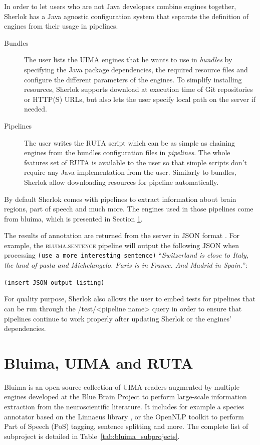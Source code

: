 \documentclass{article}
\newcommand{\ID}[1]{{\textsc{#1}}}
\newcommand{\TODO}[1]{\texttt{\textcolor{YellowOrange}{(#1)}}} %
\newcommand{\REST}[1]{\textsf{#1}}
\begin{document}
In order to let users who are not Java developers combine engines together, Sherlok has a Java
agnostic configuration system that separate the definition of engines from their usage in pipelines.

\begin{description}
    \item[Bundles] The user lists the UIMA engines that he wants to use in \emph{bundles} by specifying
        the Java package dependencies, the required resource files and configure the different
        parameters of the engines. To simplify installing resources, Sherlok supports download at
        execution time of Git repositories or HTTP(S) URLs, but also lets the user specify local
        path on the server if needed.
    \item[Pipelines] The user writes the RUTA script which can be as simple as chaining engines from
        the bundles configuration files in \emph{pipelines}. The whole features set of RUTA is
        available to the user so that simple scripts don't require any Java implementation from the
        user. Similarly to bundles, Sherlok allow downloading resources for pipeline automatically.
\end{description}

By default Sherlok comes with pipelines to extract information about brain regions, part of speech
and much more. The engines used in those pipelines come from bluima, which is presented in Section
\ref{sec:bluima}.

The results of annotation are returned from the server in JSON format \cite{json}. For example, the
\ID{bluima.sentence} pipeline will output the following JSON when processing \TODO{use a more
interesting sentence} ``\textit{Switzerland is close to Italy, the land of pasta and Michelangelo.
Paris is in France. And Madrid in Spain.}'':

\TODO{insert JSON output listing}

For quality purpose, Sherlok also allows the user to embed tests for pipelines that can be run
through the \REST{/test/<pipeline name>} query in order to ensure that pipelines continue to work
properly after updating Sherlok or the engines' dependencies.

\section{Bluima, UIMA and RUTA}
\label{sec:bluima}

Bluima is an open-source collection of UIMA readers \cite{uima} augmented by multiple engines
developed at the Blue Brain Project \cite{bbp} to perform large-scale information extraction from
the neuroscientific literature. It includes for example a species annotator based on the Linnaeus
library \cite{linnaeus}, or the OpenNLP toolkit \cite{opennlp} to perform Part of Speech (PoS)
tagging, sentence splitting and more. The complete list of subproject is detailed in
Table~\ref{tab:bluima_subprojects}.
\end{document}
